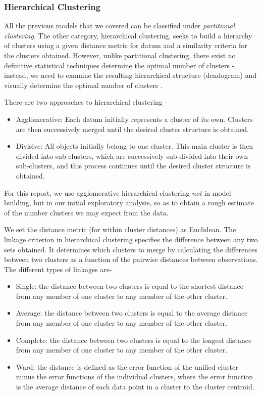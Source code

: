 \subsubsection{Hierarchical Clustering}

All the previous models that we covered can be classified under \textit{partitional clustering}. The other category, hierarchical clustering, seeks to build a hierarchy of clusters using a given distance metric for datum and a similarity criteria for the clusters obtained. However, unlike partitional clustering, there exist no definitive statistical techniques determine the optimal number of clusters - instead, we need to examine the resulting hierarchical structure (dendogram) and visually determine the optimal number of clusters \cite{maimon2005data}.
 
 There are two approaches to hierarchical clustering - 
 \begin{itemize}
     \item Agglomerative: Each datum initially represents a cluster of its own. Clusters are then successively merged until the desired cluster structure is obtained.
     \item Divisive: All objects initially belong to one cluster. This main cluster is then divided into sub-clusters, which are successively sub-divided into their own sub-clusters, and this process continues until the desired cluster structure is obtained.
 \end{itemize}
 
For this report, we use agglomerative hierarchical clustering \textit{not} in model building, but in our initial exploratory analysis, so as to obtain a rough estimate of the number clusters we may expect from the data.

We set the distance metric (for within cluster distances) as Euclidean. 
The linkage criterion in hierarchical clustering specifies the difference between any two sets obtained. It determines which clusters to merge by calculating the differences between two clusters as a function of the pairwise distances between observations. The different types of linkages are-
\begin{itemize}
    \item Single: the distance between two clusters is equal to the shortest distance from any member of one cluster to any member of the other cluster. 
    \item Average: the distance between two clusters is equal to the average distance from any member of one cluster to any member of the other cluster.
    \item Complete: the distance between two clusters is equal to the longest distance from any member of one cluster to any member of the other cluster.
    \item Ward: the distance is defined as the error function of the unified cluster minus the error functions of the individual clusters, where the error function is the average distance of each data point in a cluster to the cluster centroid.
\end{itemize}

